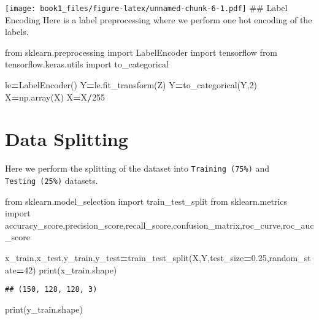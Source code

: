 \documentclass[]{book}
\newenvironment{Shaded}{\begin{snugshade}}{\end{snugshade}}
\newcommand{\BuiltInTok}[1]{#1}
\newcommand{\DecValTok}[1]{\textcolor[rgb]{0.00,0.00,0.81}{#1}}
\newcommand{\FloatTok}[1]{\textcolor[rgb]{0.00,0.00,0.81}{#1}}
\newcommand{\ImportTok}[1]{#1}
\newcommand{\NormalTok}[1]{#1}
\newcommand{\OperatorTok}[1]{\textcolor[rgb]{0.81,0.36,0.00}{\textbf{#1}}}
\begin{document}
\texttt{[image: book1\_files/figure-latex/unnamed-chunk-6-1.pdf]}
\#\# Label Encoding
Here is a label preprocessing where we perform one hot encoding of the labels.

\begin{Shaded}
\begin{Highlighting}[]
\ImportTok{from}\NormalTok{ sklearn.preprocessing }\ImportTok{import}\NormalTok{ LabelEncoder}
\ImportTok{import}\NormalTok{ tensorflow }
\ImportTok{from}\NormalTok{ tensorflow.keras.utils }\ImportTok{import}\NormalTok{ to_categorical}

\NormalTok{le}\OperatorTok{=}\NormalTok{LabelEncoder()}
\NormalTok{Y}\OperatorTok{=}\NormalTok{le.fit_transform(Z)}
\NormalTok{Y}\OperatorTok{=}\NormalTok{to_categorical(Y,}\DecValTok{2}\NormalTok{)}
\NormalTok{X}\OperatorTok{=}\NormalTok{np.array(X)}
\NormalTok{X}\OperatorTok{=}\NormalTok{X}\OperatorTok{/}\DecValTok{255}
\end{Highlighting}
\end{Shaded}

\hypertarget{data-splitting}{%
\section{Data Splitting}\label{data-splitting}}

Here we perform the splitting of the dataset into \texttt{Training\ (75\%)} and \texttt{Testing\ (25\%)} datasets.

\begin{Shaded}
\begin{Highlighting}[]
\ImportTok{from}\NormalTok{ sklearn.model_selection }\ImportTok{import}\NormalTok{ train_test_split}
\ImportTok{from}\NormalTok{ sklearn.metrics }\ImportTok{import}\NormalTok{ accuracy_score,precision_score,recall_score,confusion_matrix,roc_curve,roc_auc_score}

\NormalTok{x_train,x_test,y_train,y_test}\OperatorTok{=}\NormalTok{train_test_split(X,Y,test_size}\OperatorTok{=}\FloatTok{0.25}\NormalTok{,random_state}\OperatorTok{=}\DecValTok{42}\NormalTok{)}
\BuiltInTok{print}\NormalTok{(x_train.shape)}
\end{Highlighting}
\end{Shaded}

\begin{verbatim}
## (150, 128, 128, 3)
\end{verbatim}

\begin{Shaded}
\begin{Highlighting}[]
\BuiltInTok{print}\NormalTok{(y_train.shape)}
\end{Highlighting}
\end{Shaded}
\end{document}
